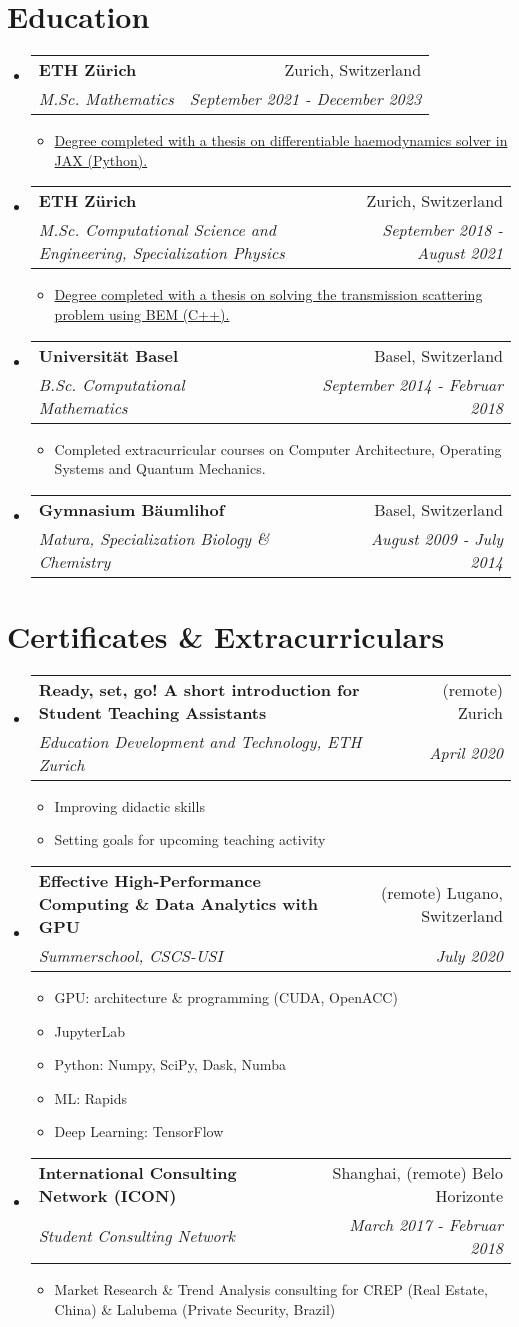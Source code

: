 \documentclass[letterpaper,11pt]{article}
\makeatletter
\newcommand{\resumeItem}[1]{%
\item\small{
		#1
	}
}
\newcommand{\resumeSubheading}[4]{
	\vspace{8pt}\item%
	\begin{tabular*}{0.97\textwidth}[t]{l@{\extracolsep{\fill}}r}
		\textbf{#1} & #2 \\
		\textit{\small#3} & \textit{\small #4} \\
	\end{tabular*}\vspace{-5pt}
}
\newcommand{\resumeSubHeadingListStart}{\begin{itemize}[leftmargin=*]}
\newcommand{\resumeSubHeadingListEnd}{\end{itemize}}
\newcommand{\resumeItemListStart}{\begin{itemize}}
\newcommand{\resumeItemListEnd}{\end{itemize}\vspace{-5pt}}
\makeatother
\begin{document}
\section{Education}
\resumeSubHeadingListStart
\resumeSubheading
{ETH Zürich}{Zurich, Switzerland}
{M.Sc. Mathematics}{September 2021 - December 2023}
\resumeItemListStart
\resumeItem{\href{https://github.com/DiegoRenner/jaxFlowSim}{Degree completed with a thesis on differentiable haemodynamics solver in JAX (Python).}}
\resumeItemListEnd
\resumeSubheading
{ETH Zürich}{Zurich, Switzerland}
{M.Sc. Computational Science and Engineering, Specialization Physics}{September 2018 - August 2021}
\resumeItemListStart
\resumeItem{\href{https://github.com/DiegoRenner/HelmholtzTransmissionProblemBEM}{Degree completed with a thesis on solving the transmission scattering problem using BEM (C++).}}
\resumeItemListEnd
\resumeSubheading
{Universität Basel}{Basel, Switzerland}
{B.Sc. Computational Mathematics}{September 2014 - Februar 2018}
\resumeItemListStart
\resumeItem{Completed extracurricular courses on Computer Architecture, Operating Systems and Quantum Mechanics.}
\resumeItemListEnd
\resumeSubheading
{Gymnasium Bäumlihof}{Basel, Switzerland}
{Matura, Specialization Biology \& Chemistry}{August 2009 - July 2014}
\resumeSubHeadingListEnd


\section{Certificates \& Extracurriculars}
\resumeSubHeadingListStart
\resumeSubheading
{Ready, set, go! A short introduction for Student
Teaching Assistants}{(remote) Zurich}
{Education Development and Technology, ETH Zurich}{April 2020}
\resumeItemListStart
\resumeItem{Improving didactic skills}
\resumeItem{Setting goals for upcoming teaching activity}
\resumeItemListEnd
\resumeSubheading
{Effective High-Performance Computing \& Data Analytics with GPU}{(remote) Lugano, Switzerland}
{Summerschool, CSCS-USI}{July 2020}
\resumeItemListStart
\resumeItem{GPU: architecture \& programming (CUDA, OpenACC)}
\resumeItem{JupyterLab}
\resumeItem{Python: Numpy, SciPy, Dask, Numba}
\resumeItem{ML: Rapids}
\resumeItem{Deep Learning: TensorFlow}
\resumeItemListEnd
\resumeSubheading
{International Consulting Network (ICON)}{Shanghai, (remote) Belo Horizonte}
{Student Consulting Network}{March 2017 - Februar 2018}
\resumeItemListStart
\resumeItem{Market Research \& Trend Analysis consulting for CREP (Real Estate, China) \& Lalubema (Private Security, Brazil)}
\resumeItemListEnd
\resumeSubHeadingListEnd
\end{document}
